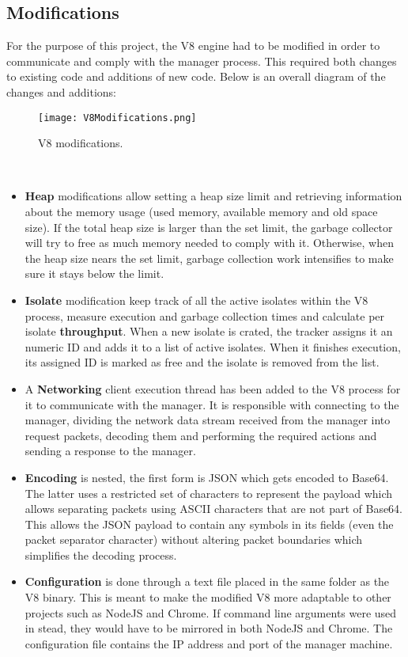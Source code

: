\documentclass{l4proj}
\begin{document}
\subsection{Modifications}
\hspace*{3em} For the purpose of this project, the V8 engine had to be modified in order to communicate and comply with the manager process. This required both changes to existing code and additions of new code. Below is an overall diagram of the changes and additions:\\
\begin{figure}[!ht]
  \centering
    \texttt{[image: V8Modifications.png]}
  \caption{V8 modifications.}
\end{figure}\\
\begin{itemize}
\item \textbf{Heap} modifications allow setting a heap size limit and retrieving information about the memory usage (used memory, available memory and old space size). If the total heap size is larger than the set limit, the garbage collector will try to free as much memory needed to comply with it. Otherwise, when the heap size nears the set limit, garbage collection work intensifies to make sure it stays below the limit.
\item \textbf{Isolate} modification keep track of all the active isolates within the V8 process, measure execution and garbage collection times and calculate per isolate \textbf{throughput}. When a new isolate is crated, the tracker assigns it an numeric ID and adds it to a list of active isolates. When it finishes execution, its assigned ID is marked as free and the isolate is removed from the list.
\item A \textbf{Networking} client execution thread has been added to the V8 process for it to communicate with the manager. It is responsible with connecting to the manager, dividing the network data stream received from the manager into request packets, decoding them and performing the required actions and sending a response to the manager.
\item \textbf{Encoding} is nested, the first form is JSON which gets encoded to Base64. The latter uses a restricted set of characters to represent the payload which allows separating packets using ASCII characters that are not part of Base64. This allows the JSON payload to contain any symbols in its fields (even the packet separator character) without altering packet boundaries which simplifies the decoding process.
\item \textbf{Configuration} is done through a text file placed in the same folder as the V8 binary. This is meant to make the modified V8 more adaptable to other projects such as NodeJS and Chrome. If command line arguments were used in stead, they would have to be mirrored in both NodeJS and Chrome. The configuration file contains the IP address and port of the manager machine.
\end{itemize}
\end{document}
